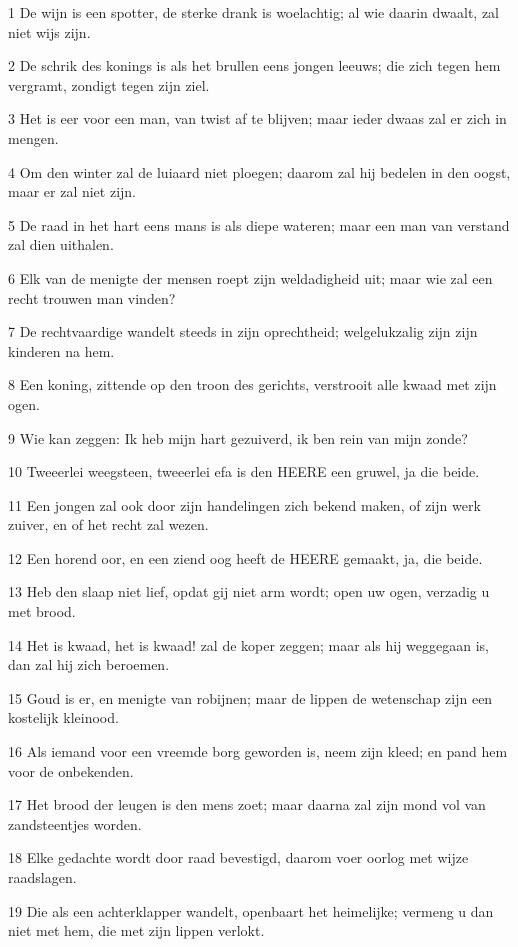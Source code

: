 \par 1 De wijn is een spotter, de sterke drank is woelachtig; al wie daarin dwaalt, zal niet wijs zijn.
\par 2 De schrik des konings is als het brullen eens jongen leeuws; die zich tegen hem vergramt, zondigt tegen zijn ziel.
\par 3 Het is eer voor een man, van twist af te blijven; maar ieder dwaas zal er zich in mengen.
\par 4 Om den winter zal de luiaard niet ploegen; daarom zal hij bedelen in den oogst, maar er zal niet zijn.
\par 5 De raad in het hart eens mans is als diepe wateren; maar een man van verstand zal dien uithalen.
\par 6 Elk van de menigte der mensen roept zijn weldadigheid uit; maar wie zal een recht trouwen man vinden?
\par 7 De rechtvaardige wandelt steeds in zijn oprechtheid; welgelukzalig zijn zijn kinderen na hem.
\par 8 Een koning, zittende op den troon des gerichts, verstrooit alle kwaad met zijn ogen.
\par 9 Wie kan zeggen: Ik heb mijn hart gezuiverd, ik ben rein van mijn zonde?
\par 10 Tweeerlei weegsteen, tweeerlei efa is den HEERE een gruwel, ja die beide.
\par 11 Een jongen zal ook door zijn handelingen zich bekend maken, of zijn werk zuiver, en of het recht zal wezen.
\par 12 Een horend oor, en een ziend oog heeft de HEERE gemaakt, ja, die beide.
\par 13 Heb den slaap niet lief, opdat gij niet arm wordt; open uw ogen, verzadig u met brood.
\par 14 Het is kwaad, het is kwaad! zal de koper zeggen; maar als hij weggegaan is, dan zal hij zich beroemen.
\par 15 Goud is er, en menigte van robijnen; maar de lippen de wetenschap zijn een kostelijk kleinood.
\par 16 Als iemand voor een vreemde borg geworden is, neem zijn kleed; en pand hem voor de onbekenden.
\par 17 Het brood der leugen is den mens zoet; maar daarna zal zijn mond vol van zandsteentjes worden.
\par 18 Elke gedachte wordt door raad bevestigd, daarom voer oorlog met wijze raadslagen.
\par 19 Die als een achterklapper wandelt, openbaart het heimelijke; vermeng u dan niet met hem, die met zijn lippen verlokt.
